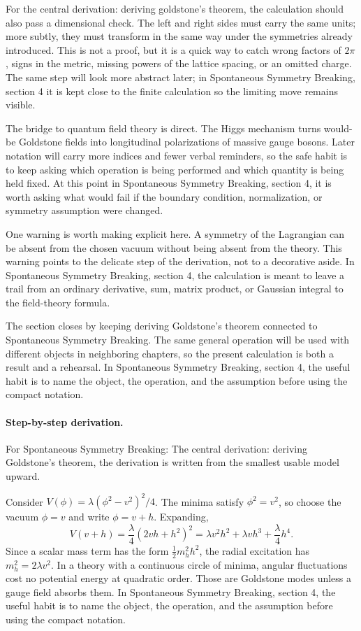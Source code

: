 For the central derivation: deriving goldstone's theorem, the calculation should also pass a dimensional check.  The left and right sides must carry the same units; more subtly, they must transform in the same way under the symmetries already introduced.  This is not a proof, but it is a quick way to catch wrong factors of \(2\pi\), signs in the metric, missing powers of the lattice spacing, or an omitted charge.  The same step will look more abstract later; in Spontaneous Symmetry Breaking, section 4 it is kept close to the finite calculation so the limiting move remains visible.

The bridge to quantum field theory is direct.  The Higgs mechanism turns would-be Goldstone fields into longitudinal polarizations of massive gauge bosons.  Later notation will carry more indices and fewer verbal reminders, so the safe habit is to keep asking which operation is being performed and which quantity is being held fixed.  At this point in Spontaneous Symmetry Breaking, section 4, it is worth asking what would fail if the boundary condition, normalization, or symmetry assumption were changed.

One warning is worth making explicit here.  A symmetry of the Lagrangian can be absent from the chosen vacuum without being absent from the theory.  This warning points to the delicate step of the derivation, not to a decorative aside.  In Spontaneous Symmetry Breaking, section 4, the calculation is meant to leave a trail from an ordinary derivative, sum, matrix product, or Gaussian integral to the field-theory formula.

The section closes by keeping deriving Goldstone's theorem connected to Spontaneous Symmetry Breaking.  The same general operation will be used with different objects in neighboring chapters, so the present calculation is both a result and a rehearsal.  In Spontaneous Symmetry Breaking, section 4, the useful habit is to name the object, the operation, and the assumption before using the compact notation.



\paragraph{Step-by-step derivation.}

For Spontaneous Symmetry Breaking: The central derivation: deriving Goldstone's theorem, the derivation is written from the smallest usable model upward.

Consider \(V(\phi)=\lambda(\phi^2-v^2)^2/4\).  The minima satisfy \(\phi^2=v^2\), so choose the vacuum \(\phi=v\) and write \(\phi=v+h\).  Expanding,
\[
  V(v+h)=\frac{\lambda}{4}(2vh+h^2)^2
  =\lambda v^2h^2+\lambda vh^3+\frac{\lambda}{4}h^4.
\]
Since a scalar mass term has the form \(\frac12m_h^2h^2\), the radial excitation has \(m_h^2=2\lambda v^2\).  In a theory with a continuous circle of minima, angular fluctuations cost no potential energy at quadratic order.  Those are Goldstone modes unless a gauge field absorbs them.  In Spontaneous Symmetry Breaking, section 4, the useful habit is to name the object, the operation, and the assumption before using the compact notation.

